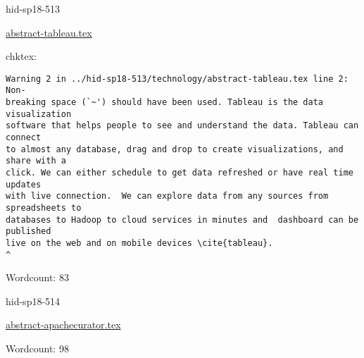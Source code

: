 \begin{IU}

hid-sp18-513

\href{https://github.com/cloudmesh-community/hid-sp18-513/blob/master//technology/abstract-tableau.tex}{abstract-tableau.tex}

 
chktex:
\begin{tiny}
\begin{verbatim}
Warning 2 in ../hid-sp18-513/technology/abstract-tableau.tex line 2: Non-
breaking space (`~') should have been used. Tableau is the data visualization
software that helps people to see and understand the data. Tableau can connect
to almost any database, drag and drop to create visualizations, and share with a
click. We can either schedule to get data refreshed or have real time updates
with live connection.  We can explore data from any sources from spreadsheets to
databases to Hadoop to cloud services in minutes and  dashboard can be published
live on the web and on mobile devices \cite{tableau}.
^
\end{verbatim}
\end{tiny}

Wordcount: 83

\end{IU}



\begin{IU}

hid-sp18-514

\href{https://github.com/cloudmesh-community/hid-sp18-514/blob/master//technology/abstract-apachecurator.tex}{abstract-apachecurator.tex}

 

Wordcount: 98

\end{IU}



